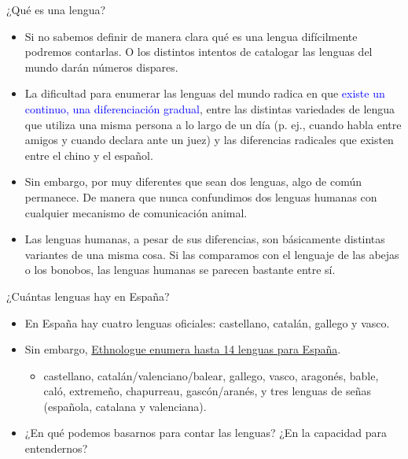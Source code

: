 \documentclass[handout]{beamer}
\begin{document}
\begin{frame}{¿Qué es una lengua?}

\begin{itemize}
	\item Si no sabemos definir de manera clara qué es una lengua difícilmente podremos contarlas. O los distintos intentos de catalogar las lenguas del mundo darán números dispares.
	\item La dificultad para enumerar las lenguas del mundo radica en que \textcolor{blue}{existe un continuo, una diferenciación gradual}, entre las distintas variedades de lengua que utiliza una misma persona a lo largo de un día (p. ej., cuando habla entre amigos y cuando declara ante un juez) y las diferencias radicales que existen entre el chino y el español.
	\item Sin embargo, por muy diferentes que sean dos lenguas, algo de común permanece. De manera que nunca confundimos dos lenguas humanas con cualquier mecanismo de comunicación animal.
	\item Las lenguas humanas, a pesar de sus diferencias, son básicamente distintas variantes de una misma cosa. Si las comparamos con el lenguaje de las abejas o los bonobos, las lenguas humanas se parecen bastante entre sí.
\end{itemize}
\end{frame}

\begin{frame}{¿Cuántas lenguas hay en España?}
\begin{itemize}
	\item En España hay cuatro lenguas oficiales: castellano, catalán, gallego y vasco.
	\item Sin embargo, \href{http://www.ethnologue.com/show_country.asp?name=ES}{Ethnologue enumera hasta 14 lenguas para España}.
	\pause
	\begin{itemize}
		\item castellano, catalán/valenciano/balear, gallego, vasco, aragonés, bable, caló, extremeño, chapurreau, gascón/aranés, y tres lenguas de señas (española, catalana y valenciana). 
	\end{itemize}
	\item ¿En qué podemos basarnos para contar las lenguas? ¿En la capacidad para entendernos?
\end{itemize}

\end{frame}
\end{document}
